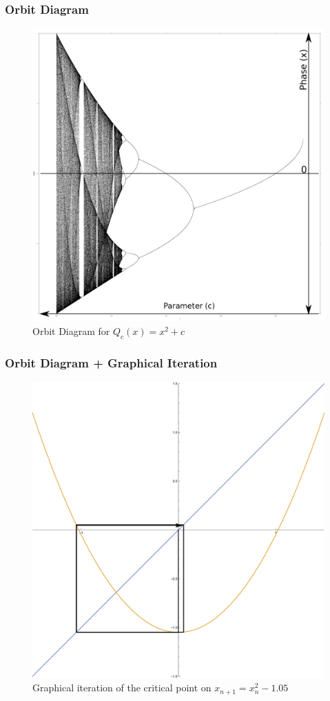 \documentclass{beamer}
\newcommand{\<}{\left\langle}
\renewcommand{\>}{\right\rangle} %
\renewcommand{\*}{\cdot} %
\begin{document}
\begin{frame}
	\frametitle{Orbit Diagram}
	\begin{figure}
		\includegraphics[height=.85\textheight]{./img/original.png}
		\caption{Orbit Diagram for $Q_c (x) = x^2 + c$}
	\end{figure}
\end{frame}

\begin{frame}
	\frametitle{Orbit Diagram + Graphical Iteration}
	\begin{figure}
		\includegraphics[height=.85\textheight]{./img/plot3_-105}
		\caption{Graphical iteration of the critical point on $x_{n+1} = x_{n}^2 - 1.05$}
	\end{figure}
\end{frame}
\end{document}
